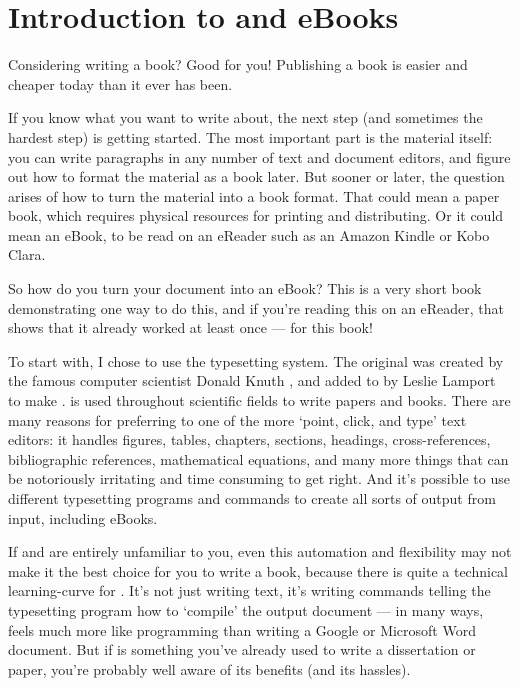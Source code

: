 
\chapter{Introduction to \latex and eBooks}

Considering writing a book? Good for you! Publishing a book is easier and cheaper today 
than it ever has been. 

If you know what you want to write about, the next step (and sometimes the 
hardest step) is getting started. The most important part is the material itself: 
you can write paragraphs in any number of text and document editors, 
and figure out how to format the material as a book later. But sooner or later, 
the question arises of how to turn the material into a book format. That could mean a paper book, 
which requires physical resources for printing and distributing. Or it could mean
an eBook, to be read on an eReader such as an Amazon Kindle or Kobo Clara.

So how do you turn your document into an eBook? This is a very short book demonstrating one 
way to do this, and if you're reading this on an eReader, that shows
that it already worked at least once --- for this book!

To start with, I chose to use the \latex typesetting system. 
The original \tex was created by the famous computer scientist Donald Knuth \citep{knuth1984texbook},
and added to by Leslie Lamport to make \latex \citep{lamport1985latex}.
\latex is used throughout scientific fields to write papers and books. There are many
reasons for preferring \latex to one of the more `point, click, and type' text editors:
it handles figures, tables, chapters, sections, headings, cross-references, 
bibliographic references, mathematical equations, and many more things that can be 
notoriously irritating and time consuming to get right. And it's possible to use different typesetting
programs and commands to create all sorts of output from \latex input, including eBooks.

If \tex and \latex are entirely unfamiliar to you, even this automation and flexibility 
may not make it the best choice for you to write a book, because there is quite a technical 
learning-curve for \latex. It's not just writing text, it's writing commands telling the
typesetting program how to `compile' the output document --- in many ways, \latex
feels much more like programming than writing a Google or Microsoft Word document. But if
\latex is something you've already used to write a dissertation or paper, you're 
probably well aware of its benefits (and its hassles). 

